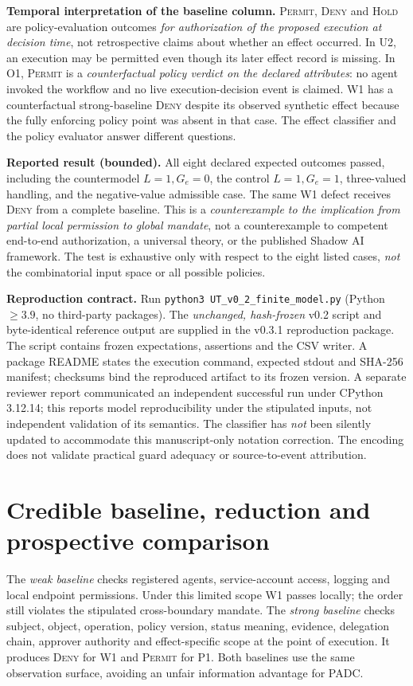 \documentclass[11pt,a4paper]{article}
\begin{document}
\textbf{Temporal interpretation of the baseline column.} \textsc{Permit}, \textsc{Deny} and \textsc{Hold} are policy-evaluation outcomes \emph{for authorization of the proposed execution at decision time}, not retrospective claims about whether an effect occurred. In U2, an execution may be permitted even though its later effect record is missing. In O1, \textsc{Permit} is a \emph{counterfactual policy verdict on the declared attributes}: no agent invoked the workflow and no live execution-decision event is claimed. W1 has a counterfactual strong-baseline \textsc{Deny} despite its observed synthetic effect because the fully enforcing policy point was absent in that case. The effect classifier and the policy evaluator answer different questions.

\textbf{Reported result (bounded).} All eight declared expected outcomes passed, including the countermodel $L=1,G_e=0$, the control $L=1,G_e=1$, three-valued handling, and the negative-value admissible case. The same W1 defect receives \textsc{Deny} from a complete baseline. This is a \emph{counterexample to the implication from partial local permission to global mandate}, not a counterexample to competent end-to-end authorization, a universal theory, or the published Shadow AI framework. The test is exhaustive only with respect to the eight listed cases, \emph{not} the combinatorial input space or all possible policies.

\textbf{Reproduction contract.} Run \texttt{python3 UT\_v0\_2\_finite\_model.py} (Python $\geq3.9$, no third-party packages). The \emph{unchanged, hash-frozen} v0.2 script and byte-identical reference output  are supplied in the v0.3.1 reproduction package. The script contains frozen expectations, assertions and the CSV writer. A package README states the execution command, expected stdout and SHA-256 manifest; checksums bind the reproduced artifact to its frozen version. A separate reviewer report communicated an independent successful run under CPython 3.12.14; this reports model reproducibility under the stipulated inputs, not independent validation of its semantics. The classifier has \emph{not} been silently updated to accommodate this manuscript-only notation correction. The encoding does not validate practical guard adequacy or source-to-event attribution.

\section{Credible baseline, reduction and prospective comparison}
The \emph{weak baseline} checks registered agents, service-account access, logging and local endpoint permissions. Under this limited scope W1 passes locally; the order still violates the stipulated cross-boundary mandate. The \emph{strong baseline} checks subject, object, operation, policy version, status meaning, evidence, delegation chain, approver authority and effect-specific scope at the point of execution. It produces \textsc{Deny} for W1 and \textsc{Permit} for P1. Both baselines use the same observation surface, avoiding an unfair information advantage for PADC.
\end{document}
